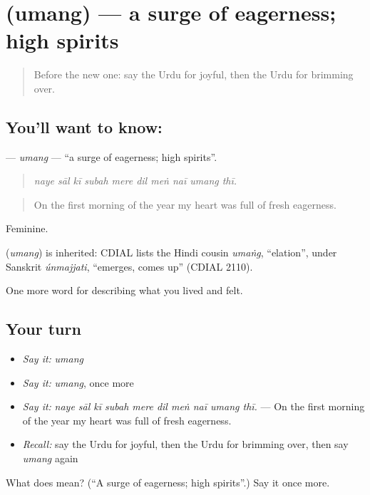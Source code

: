 \section[\texorpdfstring{\ur{امنگ} (umang)}{امنگ (umang)}]{ (umang) — a surge of eagerness; high spirits}

\label{lesson:UR-C441-umang}



\begin{quote}
Before the new one: say the Urdu for joyful, then the Urdu for brimming over.
\end{quote}

\subsection*{You'll want to know: }
\textbf{} — \emph{umang} — \textquotedblleft{}a surge of eagerness; high spirits\textquotedblright{}.

\begin{quote}
         
\end{quote}

\begin{quote}
\emph{naye sāl kī subah mere dil meṅ naī umang thī.}
\end{quote}

\begin{quote}
On the first morning of the year my heart was full of fresh eagerness.
\end{quote}

Feminine.

\begin{cousinweb}
\textbf{} (\emph{umang}) is inherited: CDIAL lists the Hindi cousin \emph{umaṅg}, \textquotedblleft{}elation\textquotedblright{}, under Sanskrit \emph{únmajjati}, \textquotedblleft{}emerges, comes up\textquotedblright{} (CDIAL 2110).
\end{cousinweb}

\begin{grammarlens}[title={What you've built}]
One more word for describing what you lived and felt.
\end{grammarlens}

\subsection*{Your turn}
\begin{itemize}
\raggedright
  \item \emph{Say it:} \emph{umang}
  \item \emph{Say it:} \emph{umang}, once more
  \item \emph{Say it:} \emph{naye sāl kī subah mere dil meṅ naī umang thī.} — On the first morning of the year my heart was full of fresh eagerness.
  \item \emph{Recall:} say the Urdu for joyful, then the Urdu for brimming over, then say \emph{umang} again
\end{itemize}

\begin{tcolorbox}[breakable,colback=teal!4,colframe=teal!35!black,title={Before you move on}]
What does  mean? (\textquotedblleft{}A surge of eagerness; high spirits\textquotedblright{}.) Say it once more.
\end{tcolorbox}
